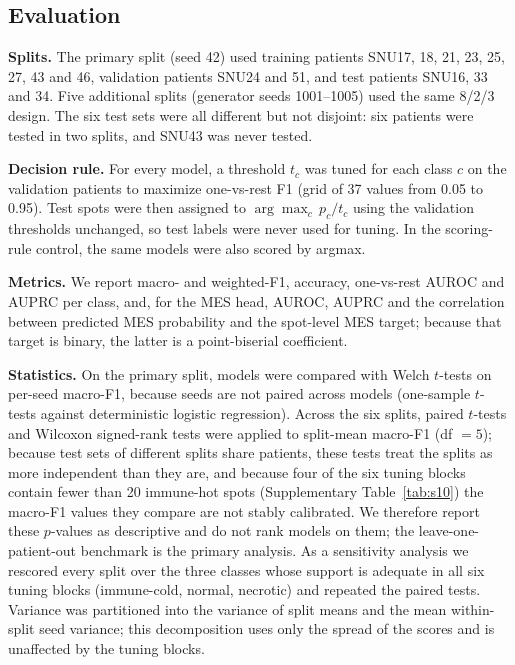 \documentclass[11pt,letterpaper]{article}
\begin{document}
\subsection{Evaluation}

\textbf{Splits.} The primary split (seed 42) used training patients SNU17, 18, 21, 23, 25, 27, 43 and 46, validation patients SNU24 and 51, and test patients SNU16, 33 and 34. Five additional splits (generator seeds 1001--1005) used the same 8/2/3 design. The six test sets were all different but not disjoint: six patients were tested in two splits, and SNU43 was never tested.

\textbf{Decision rule.} For every model, a threshold $t_c$ was tuned for each class $c$ on the validation patients to maximize one-vs-rest F1 (grid of 37 values from 0.05 to 0.95). Test spots were then assigned to $\arg\max_c\, p_c / t_c$ using the validation thresholds unchanged, so test labels were never used for tuning. In the scoring-rule control, the same models were also scored by argmax.

\textbf{Metrics.} We report macro- and weighted-F1, accuracy, one-vs-rest AUROC and AUPRC per class, and, for the MES head, AUROC, AUPRC and the correlation between predicted MES probability and the spot-level MES target; because that target is binary, the latter is a point-biserial coefficient.

\textbf{Statistics.} On the primary split, models were compared with Welch $t$-tests on per-seed macro-F1, because seeds are not paired across models (one-sample $t$-tests against deterministic logistic regression). Across the six splits, paired $t$-tests and Wilcoxon signed-rank tests were applied to split-mean macro-F1 (df $= 5$); because test sets of different splits share patients, these tests treat the splits as more independent than they are, and because four of the six tuning blocks contain fewer than 20 immune-hot spots (Supplementary Table~\ref{tab:s10}) the macro-F1 values they compare are not stably calibrated. We therefore report these $p$-values as descriptive and do not rank models on them; the leave-one-patient-out benchmark is the primary analysis. As a sensitivity analysis we rescored every split over the three classes whose support is adequate in all six tuning blocks (immune-cold, normal, necrotic) and repeated the paired tests. Variance was partitioned into the variance of split means and the mean within-split seed variance; this decomposition uses only the spread of the scores and is unaffected by the tuning blocks.
\end{document}
